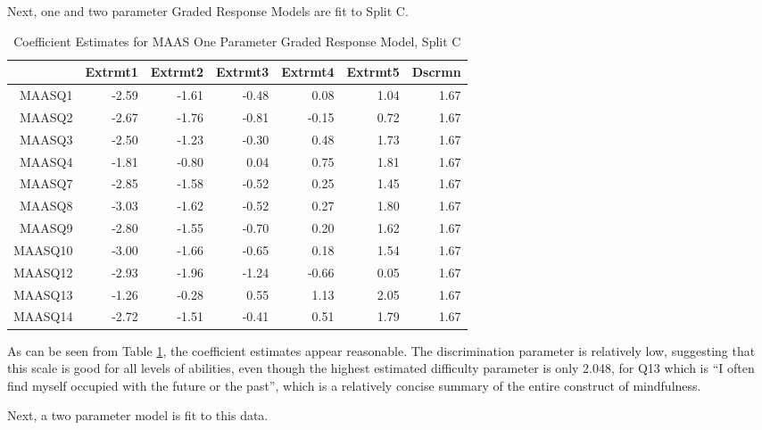 \documentclass{article}
\begin{document}
Next, one and two parameter Graded Response Models are fit to Split C.


\begin{table}[ht]
\centering
\begin{tabular}{rrrrrrr}
  \hline
 & Extrmt1 & Extrmt2 & Extrmt3 & Extrmt4 & Extrmt5 & Dscrmn \\ 
  \hline
MAASQ1 & -2.59 & -1.61 & -0.48 & 0.08 & 1.04 & 1.67 \\ 
  MAASQ2 & -2.67 & -1.76 & -0.81 & -0.15 & 0.72 & 1.67 \\ 
  MAASQ3 & -2.50 & -1.23 & -0.30 & 0.48 & 1.73 & 1.67 \\ 
  MAASQ4 & -1.81 & -0.80 & 0.04 & 0.75 & 1.81 & 1.67 \\ 
  MAASQ7 & -2.85 & -1.58 & -0.52 & 0.25 & 1.45 & 1.67 \\ 
  MAASQ8 & -3.03 & -1.62 & -0.52 & 0.27 & 1.80 & 1.67 \\ 
  MAASQ9 & -2.80 & -1.55 & -0.70 & 0.20 & 1.62 & 1.67 \\ 
  MAASQ10 & -3.00 & -1.66 & -0.65 & 0.18 & 1.54 & 1.67 \\ 
  MAASQ12 & -2.93 & -1.96 & -1.24 & -0.66 & 0.05 & 1.67 \\ 
  MAASQ13 & -1.26 & -0.28 & 0.55 & 1.13 & 2.05 & 1.67 \\ 
  MAASQ14 & -2.72 & -1.51 & -0.41 & 0.51 & 1.79 & 1.67 \\ 
   \hline
\end{tabular}
\caption{Coefficient Estimates for MAAS One Parameter Graded Response Model, Split C} 
\label{tab:maas2cgrm1pl}
\end{table}

As can be seen from Table \ref{tab:maas2cgrm1pl}, the coefficient estimates appear reasonable. The discrimination parameter is relatively low, suggesting that this scale is good for all levels of abilities, even though the highest estimated difficulty parameter is only 2.048, for Q13 which is ``I often find myself occupied with the future or the past'', which is a relatively concise summary of the entire construct of mindfulness. 

Next, a two parameter model is fit to this data. 
\end{document}
